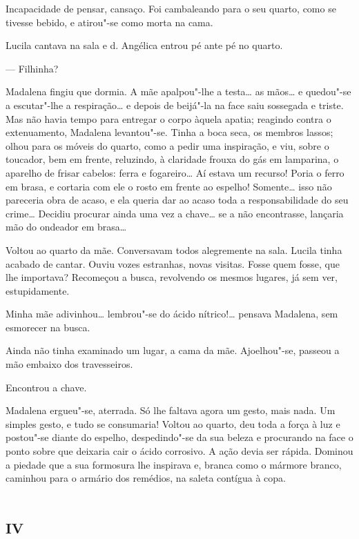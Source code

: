 Incapacidade de pensar, cansaço. Foi cambaleando para o seu quarto, como
se tivesse bebido, e atirou"-se como morta na cama.

Lucila cantava na sala e d. Angélica entrou pé ante pé no quarto.

--- Filhinha?

Madalena fingiu que dormia. A mãe apalpou"-lhe a testa\ldots{} as mãos\ldots{} e
quedou"-se a escutar"-lhe a respiração\ldots{} e depois de beijá"-la na face
saiu sossegada e triste. Mas não havia tempo para entregar o corpo
àquela apatia; reagindo contra o extenuamento, Madalena levantou"-se.
Tinha a boca seca, os membros lassos; olhou para os móveis do quarto,
como a pedir uma inspiração, e viu, sobre o toucador, bem em frente,
reluzindo, à claridade frouxa do gás em lamparina, o aparelho de frisar
cabelos: ferra e fogareiro\ldots{} Aí estava um recurso! Poria o ferro em
brasa, e cortaria com ele o rosto em frente ao espelho! Somente\ldots{} isso
não pareceria obra de acaso, e ela queria dar ao acaso toda a
responsabilidade do seu crime\ldots{} Decidiu procurar ainda uma vez a
chave\ldots{} se a não encontrasse, lançaria mão do ondeador em brasa\ldots{}

Voltou ao quarto da mãe. Conversavam todos alegremente na sala. Lucila
tinha acabado de cantar. Ouviu vozes estranhas, novas visitas. Fosse
quem fosse, que lhe importava? Recomeçou a busca, revolvendo os mesmos
lugares, já sem ver, estupidamente.

Minha mãe adivinhou\ldots{} lembrou"-se do ácido nítrico!\ldots{} pensava Madalena,
sem esmorecer na busca.

Ainda não tinha examinado um lugar, a cama da mãe. Ajoelhou"-se, passeou
a mão embaixo dos travesseiros.

Encontrou a chave.

Madalena ergueu"-se, aterrada. Só lhe faltava agora um gesto, mais nada.
Um simples gesto, e tudo se consumaria! Voltou ao quarto, deu toda a
força à luz e postou"-se diante do espelho, despedindo"-se da sua beleza e
procurando na face o ponto sobre que deixaria cair o ácido corrosivo. A
ação devia ser rápida. Dominou a piedade que a sua formosura lhe
inspirava e, branca como o mármore branco, caminhou para o armário dos
remédios, na saleta contígua à copa.

\section{\textsc{iv}}

